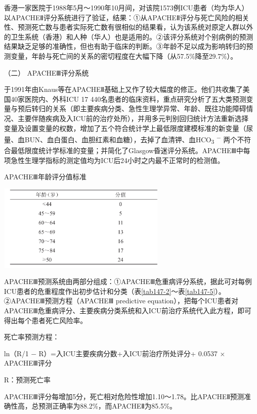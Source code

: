 香港一家医院于1988年5月～1990年10月间，对该院1573例ICU患者（均为华人）以APACHEⅡ评分系统进行了验证，结果：①从APACHEⅡ评分与死亡风险的相关性、预测死亡数与患者实际死亡数有很相似的结果看，认为该系统对原定人群以外的卫生系统（香港）和人种（华人）也是适用的。②该评分系统对个别病例的预测结果缺乏足够的准确性，但也有助于临床的判断。③年龄不足以成为影响转归的预测变量，年龄与死亡间的关系的密切程度在大幅下降（从57.5\%降至29.7\%）。

\hypertarget{text00401.htmlux5cux23CHP16-14-1-1-2}{}
（二） APACHEⅢ评分系统

于1991年由Knaus等在APACHEⅡ基础上又作了较大幅度的修正。他们共收集了美国40家医院内、外科ICU
17
440名患者的临床资料，重点研究分析了五大类预测变量与预后转归的关系（即主要疾病分类、急性生理学异常、年龄、既往功能障碍情况、主要伴随疾病及入ICU前的治疗处所），并用多元判别回归统计方法重新选择变量及设置变量的权数，增加了五个符合统计学上最低限度建模标准的新变量（尿量、血BUN、血白蛋白、血胆红素和血糖），去掉了血清钾、血HCO\textsubscript{3}
\textsuperscript{−}
两个不符合最低限度统计学标准的变量；并简化了Glasgow昏迷评分系统。APACHEⅢ中每项急性生理学指标的测定值均为ICU后24小时之内最不正常时的检测值。

\begin{table}[htbp]
\centering
\caption{APACHEⅢ年龄评分值标准}
\label{tab147-2}
\includegraphics[width=3.25in,height=1.66667in]{./images/Image00536.jpg}
\end{table}

APACHEⅢ预测系统由两部分组成：①APACHEⅢ危重病评分系统，据此可对每例ICU患者的危重程度作出初步估计和分类（表\ref{tab147-2}～表\ref{tab147-5}）。②APACHEⅢ预测方程（APACHEⅢ
predictive
equation），把每个ICU患者对APACHEⅢ危重病评分、主要疾病分类系统和入ICU前治疗系统代入此方程，即可得出每个患者死亡风险率。

死亡率预测方程：

ln（R/1 − R）=入ICU主要疾病分数+入ICU前治疗所处评分+ 0.0537 ×
APACHEⅢ评分

R：预测死亡率

APACHEⅢ评分每增加5分，死亡相对危险性增加1.10～1.78。比APACHEⅡ预测准确性高，总预测正确率为88.2\%，而APACHEⅡ为85.5\%。

